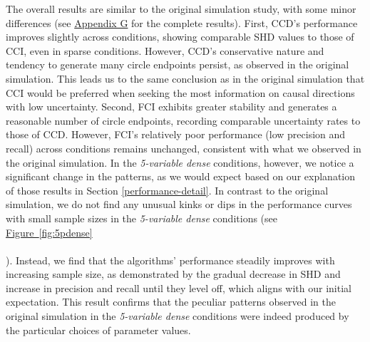 \documentclass[twoside, 11pt]{article}
\newcommand*{\figref}[2][]{%
  \hyperref[{fig:#2}]{%
    Figure~\ref*{fig:#2}%
    \ifx\\#1\\%
    \else
      #1%
    \fi
  }%
}
\begin{document}
The overall results are similar to the original simulation study, with some minor differences (see \hyperref[varyingbeta]{Appendix G} for the complete results). First, CCD's performance improves slightly across conditions, showing comparable SHD values to those of CCI, even in sparse conditions. However, CCD's conservative nature and tendency to generate many circle endpoints persist, as observed in the original simulation. 
This leads us to the same conclusion as in the original simulation that CCI would be preferred when seeking the most information on causal directions with low uncertainty. 
Second, FCI exhibits greater stability and generates a reasonable number of circle endpoints, recording comparable uncertainty rates to those of CCD. However, FCI's relatively poor performance (low precision and recall) across conditions remains unchanged, consistent with what we observed in the original simulation.
In the \textit{5-variable dense} conditions, however, we notice a significant change in the patterns, as we would expect based on our explanation of those results in Section \ref{performance-detail}. In contrast to the original simulation, we do not find any unusual kinks or dips in the performance curves with small sample sizes in the \textit{5-variable dense} conditions (see \figref[]{5pdense}). Instead, we find that the algorithms' performance steadily improves with increasing sample size, as demonstrated by the gradual decrease in SHD and increase in precision and recall until they level off, which aligns with our initial expectation.
This result confirms that the peculiar patterns observed in the original simulation in the \textit{5-variable dense} conditions were indeed produced by the particular choices of parameter values.
\end{document}
